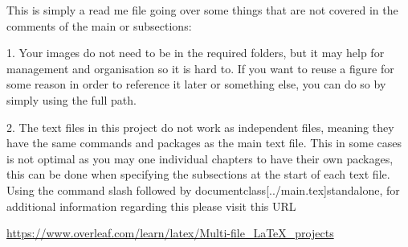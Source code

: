 This is simply a read me file going over some things that are not covered in the comments of the main or subsections:

1. Your images do not need to be in the required folders, but it may help for management and organisation so it is hard to. If you want to reuse a figure for some reason in order to reference it later or something else, you can do so by simply using the full path.

2. The text files in this project do not work as independent files, meaning they have the same commands and packages as the main text file. 
This in some cases is not optimal as you may one individual chapters to have their own packages,
this can be done when specifying the subsections at the start of each text file. 
Using the command slash followed by documentclass[../main.tex]{standalone}, for additional information regarding this please visit this URL 

\href{https://www.overleaf.com/learn/latex/Multi-file_LaTeX_projects}{https://www.overleaf.com/learn/latex/Multi-file_LaTeX_projects}
